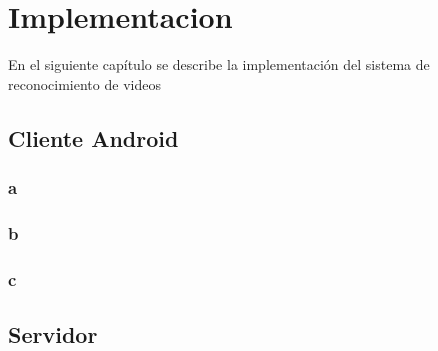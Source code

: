 \chapter{Implementacion}
En el siguiente capítulo se describe la implementación del sistema de reconocimiento de videos
\section{Cliente Android}
\subsection{a}
\subsection{b}
\subsection{c}
\section{Servidor}

\lipsum[50-60]